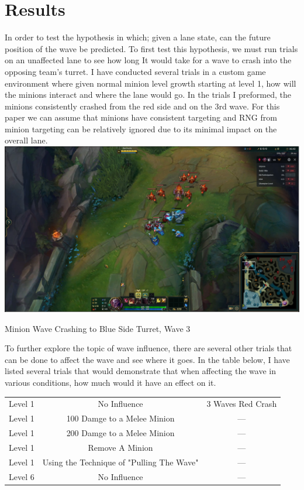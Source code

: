 \documentclass{article}
\begin{document}
\section{Results}
\begin{table}[h]
In order to test the hypothesis in which; given a lane state, can the future position of the wave be predicted. To first test this hypothesis, we must run trials on an unaffected lane to see how long It would take for a wave to crash into the opposing team’s turret. I have conducted several trials in a custom game environment where given normal minion level growth starting at level 1, how will the minions interact and where the lane would go. In the trials I preformed, the minions consistently crashed from the red side and on the 3rd wave. For this paper we can assume that minions have consistent targeting and RNG from minion targeting can be relatively ignored due to its minimal impact on the overall lane. 
\includegraphics[width=\textwidth]{Crash.PNG}
\caption[Minion Wave Crashing to Blue Side Turret]{Minion Wave Crashing to Blue Side Turret, Wave 3}
\end{table}
To further explore the topic of wave influence, there are several other trials that can be done to affect the wave and see where it goes. In the table below, I have listed several trials that would demonstrate that when affecting the wave in various conditions, how much would it have an effect on it.
\begin{center}
\begin{tabular}{ c c c}
  Level 1 & No Influence & 3 Waves Red Crash\\ 
  Level 1 & 100 Damge to  a Melee Minion & ---\\  
  Level 1 & 200 Damge to  a Melee Minion & ---\\  
  Level 1 & Remove A Minion & ---\\  
  Level 1 & Using the Technique of "Pulling The Wave"  & ---\\
  Level 6 & No Influence  & ---
\end{tabular}
\end{center}
\end{document}
